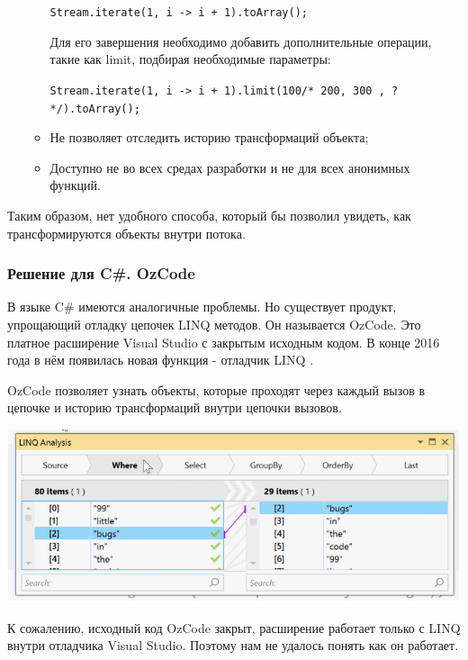 \begin{itemize}
\begin{itemize}
		\texttt{Stream.iterate(1, i -> i + 1).toArray();}
		
		Для его завершения необходимо добавить дополнительные операции, такие как limit, подбирая необходимые параметры:
		
		\texttt{Stream.iterate(1, i -> i + 1).limit(100/* 200, 300 , ? */).toArray();}
		\item Не позволяет отследить историю трансформаций объекта;
		\item Доступно не во всех средах разработки и не для всех анонимных функций.
	\end{itemize}
\end{itemize}

Таким образом, нет удобного способа, который бы позволил увидеть, как трансформируются объекты внутри потока.

\subsubsection{Решение для C\#. OzCode}
В языке C\# имеются аналогичные проблемы. Но существует продукт, упрощающий отладку цепочек LINQ методов. Он называется OzCode. Это платное расширение Visual Studio \cite{ms:vs} с закрытым исходным кодом. В конце 2016 года в нём появилась новая функция - отладчик LINQ \cite{ms:ozcode}.

OzCode позволяет узнать объекты, которые проходят через каждый вызов в цепочке и историю трансформаций внутри цепочки вызовов.

\includegraphics[scale=0.6]{chapter1/img/linq.png}

К сожалению, исходный код OzCode закрыт, расширение работает только с LINQ внутри отладчика Visual Studio. Поэтому нам не удалось понять как он работает.
